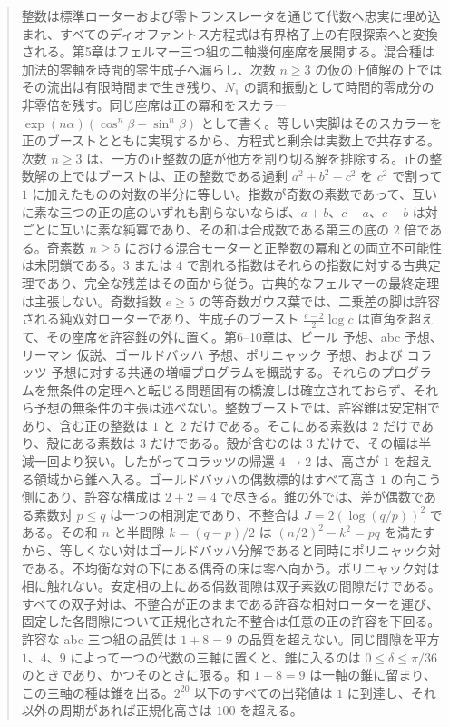 \documentclass[a4paper]{article}
\theoremstyle{definition}
\theoremstyle{remark}
\begin{document}
\begin{abstract}
整数は標準ローターおよび零トランスレータを通じて代数へ忠実に埋め込まれ、すべてのディオファントス方程式は有界格子上の有限探索へと変換される。第5章はフェルマー三つ組の二軸幾何座席を展開する。混合種は加法的零軸を時間的零生成子へ漏らし、次数 \(n\ge 3\) の仮の正値解の上ではその流出は有限時間まで生き残り、\(N_1\) の調和振動として時間的零成分の非零倍を残す。同じ座席は正の冪和をスカラー \(\exp(n\alpha)(\cos^n\beta+\sin^n\beta)\) として書く。等しい実脚はそのスカラーを正のブーストとともに実現するから、方程式と剰余は実数上で共存する。次数 \(n\ge 3\) は、一方の正整数の底が他方を割り切る解を排除する。正の整数解の上ではブーストは、正の整数である過剰 \(a^2+b^2-c^2\) を \(c^2\) で割って \(1\) に加えたものの対数の半分に等しい。指数が奇数の素数であって、互いに素な三つの正の底のいずれも割らないならば、\(a+b\)、\(c-a\)、\(c-b\) は対ごとに互いに素な純冪であり、その和は合成数である第三の底の \(2\) 倍である。奇素数 \(n\ge 5\) における混合モーターと正整数の冪和との両立不可能性は未閉鎖である。\(3\) または \(4\) で割れる指数はそれらの指数に対する古典定理であり、完全な残差はその面から従う。古典的なフェルマーの最終定理は主張しない。奇数指数 \(e\ge 5\) の等奇数ガウス葉では、二乗差の脚は許容される純双対ローターであり、生成子のブースト \(\frac{e-2}{2}\log c\) は直角を超えて、その座席を許容錐の外に置く。第6--10章は、ビール 予想、abc 予想、リーマン 仮説、ゴールドバッハ 予想、ポリニャック 予想、および コラッツ 予想に対する共通の増幅プログラムを概説する。それらのプログラムを無条件の定理へと転じる問題固有の橋渡しは確立されておらず、それら予想の無条件の主張は述べない。整数ブーストでは、許容錐は安定相であり、含む正の整数は \(1\) と \(2\) だけである。そこにある素数は \(2\) だけであり、殻にある素数は \(3\) だけである。殻が含むのは \(3\) だけで、その幅は半減一回より狭い。したがってコラッツの帰還 \(4\to 2\) は、高さが \(1\) を超える領域から錐へ入る。ゴールドバッハの偶数標的はすべて高さ \(1\) の向こう側にあり、許容な構成は \(2+2=4\) で尽きる。錐の外では、差が偶数である素数対 \(p\le q\) は一つの相測定であり、不整合は \(J=2(\log(q/p))^2\) である。その和 \(n\) と半間隙 \(k=(q-p)/2\) は \((n/2)^2-k^2=pq\) を満たすから、等しくない対はゴールドバッハ分解であると同時にポリニャック対である。不均衡な対の下にある偶奇の床は零へ向かう。ポリニャック対は相に触れない。安定相の上にある偶数間隙は双子素数の間隙だけである。すべての双子対は、不整合が正のままである許容な相対ローターを運び、固定した各間隙について正規化された不整合は任意の正の許容を下回る。許容な abc 三つ組の品質は \(1+8=9\) の品質を超えない。同じ間隙を平方 \(1\)、\(4\)、\(9\) によって一つの代数の三軸に置くと、錐に入るのは \(0\le\delta\le\pi/36\) のときであり、かつそのときに限る。和 \(1+8=9\) は一軸の錐に留まり、この三軸の種は錐を出る。\(2^{20}\) 以下のすべての出発値は \(1\) に到達し、それ以外の周期があれば正規化高さは \(100\) を超える。


\end{abstract}
\end{document}
